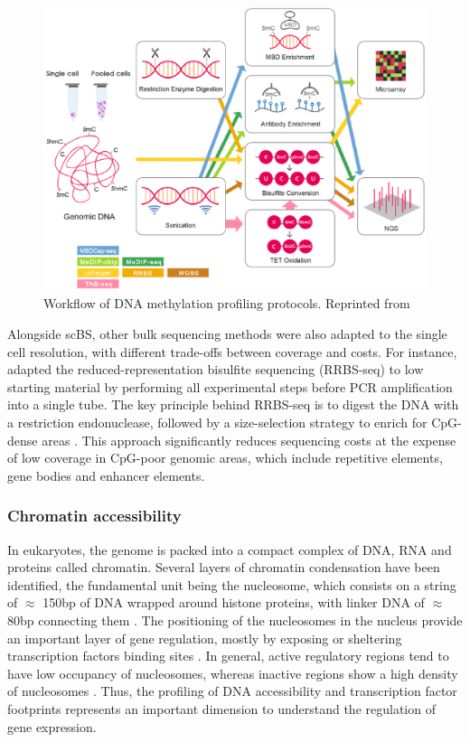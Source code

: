 \begin{figure}[H]
	\centering
	\includegraphics[width=0.8\linewidth]{methylation_protocols}
	\caption[]{Workflow of DNA methylation profiling protocols. Reprinted from \cite{Yong2016}}
	\label{fig:methylation_protocols}
\end{figure}


Alongside scBS, other bulk sequencing methods were also adapted to the single cell resolution, with different trade-offs between coverage and costs. For instance, \cite{Guo2015} adapted the reduced-representation bisulfite sequencing (RRBS-seq) to low starting material by performing all experimental steps before PCR amplification into a single tube. The key principle behind RRBS-seq is to digest the DNA with a restriction endonuclease, followed by a size-selection strategy to enrich for CpG-dense areas \cite{Meissner2005}. This approach significantly reduces sequencing costs at the expense of low coverage in CpG-poor genomic areas, which include repetitive elements, gene bodies and enhancer elements.

\subsubsection{Chromatin accessibility} \label{section:chromatin_accessibility}

In eukaryotes, the genome is packed into a compact complex of DNA, RNA and proteins called chromatin. Several layers of chromatin condensation have been identified, the fundamental unit being the nucleosome, which consists on a string of $\approx$  150bp of DNA wrapped around histone proteins, with linker DNA of $\approx$ 80bp connecting them \cite{Klemm2019,Tsompana2014}. The positioning of the nucleosomes in the nucleus provide an important layer of gene regulation, mostly by exposing or sheltering transcription factors binding sites \cite{Jiang2009}. In general, active regulatory regions tend to have low occupancy of nucleosomes, whereas inactive regions show a high density of nucleosomes \cite{Struhl2013}. Thus, the profiling of DNA accessibility and transcription factor footprints represents an important dimension to understand the regulation of gene expression.

